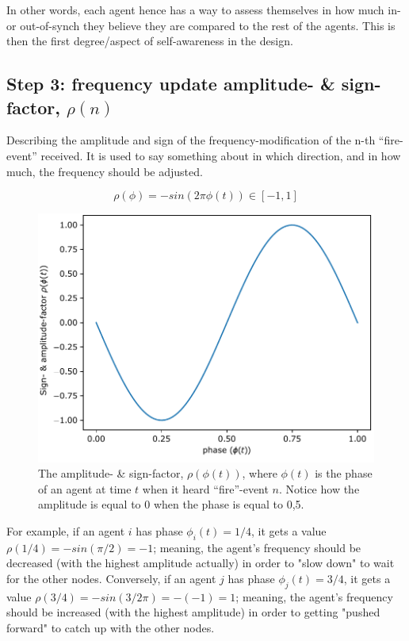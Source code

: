 In other words, each agent hence has a way to assess themselves in how much in- or out-of-synch they believe they are compared to the rest of the agents. This is then the first degree/aspect of  self-awareness in the design.

\subsection{Step 3: frequency update amplitude- \& sign-factor, $\rho(n)$}

Describing the amplitude and sign of the frequency-modification of the n-th ``fire-event'' received. It is used to say something about in which direction, and in how much, the frequency should be adjusted.

\begin{equation}
\label{amp_sign_freq_adj}
	\rho(\phi) = - sin(2\pi\phi(t)) \in [-1, 1]
\end{equation}

\begin{figure}[ht!]
	\centering
	\includegraphics[width=0.65\linewidth]{Assets/DocSegments/Chapters/Baseline/Figures/Functions/rho_n.pdf}
	\caption[Plot of amplitude- \& sign-factor for K. Nymoen's frequency-adjustment]{The amplitude- \& sign-factor, $\rho(\phi(t))$, where $\phi(t)$ is the phase of an agent at time $t$ when it heard ``fire''-event $n$. Notice how the amplitude is equal to 0 when the phase is equal to 0,5.}
	\label{fig:rho_n}
\end{figure}

For example, if an agent $i$ has phase $\phi_i(t)=1/4$, it gets a value $\rho(1/4) = - sin(\pi/2) = -1$; meaning, the agent's frequency should be decreased (with the highest amplitude actually) in order to "slow down" to wait for the other nodes. Conversely, if an agent $j$ has phase $\phi_j(t)=3/4$, it gets a value $\rho(3/4) = - sin(3/2 \pi) = -(-1) = 1$; meaning, the agent's frequency should be increased (with the highest amplitude) in order to getting "pushed forward" to catch up with the other nodes.

